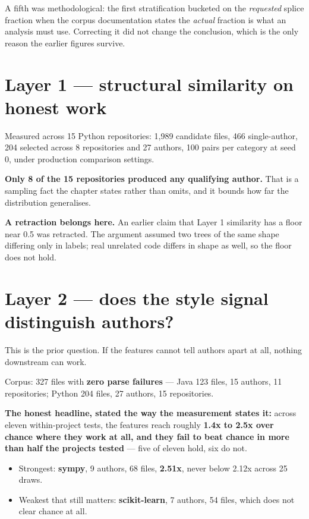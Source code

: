 A fifth was methodological: the first stratification bucketed on the
\emph{requested} splice fraction when the corpus documentation states
the \emph{actual} fraction is what an analysis must use. Correcting it
did not change the conclusion, which is the only reason the earlier
figures survive.

\hypertarget{layer-1-structural-similarity-on-honest-work}{%
\section{Layer 1 --- structural similarity on honest
work}\label{layer-1-structural-similarity-on-honest-work}}

Measured across 15 Python repositories: 1,989 candidate files, 466
single-author, 204 selected across 8 repositories and 27 authors, 100
pairs per category at seed 0, under production comparison settings.

\textbf{Only 8 of the 15 repositories produced any qualifying author.}
That is a sampling fact the chapter states rather than omits, and it
bounds how far the distribution generalises.

\textbf{A retraction belongs here.} An earlier claim that Layer 1
similarity has a floor near 0.5 was retracted. The argument assumed two
trees of the same shape differing only in labels; real unrelated code
differs in shape as well, so the floor does not hold.

\hypertarget{layer-2-does-the-style-signal-distinguish-authors}{%
\section{Layer 2 --- does the style signal distinguish
authors?}\label{layer-2-does-the-style-signal-distinguish-authors}}

This is the prior question. If the features cannot tell authors apart at
all, nothing downstream can work.

Corpus: 327 files with \textbf{zero parse failures} --- Java 123 files,
15 authors, 11 repositories; Python 204 files, 27 authors, 15
repositories.

\textbf{The honest headline, stated the way the measurement states it:}
across eleven within-project tests, the features reach roughly
\textbf{1.4x to 2.5x over chance where they work at all, and they fail
to beat chance in more than half the projects tested} --- five of eleven
hold, six do not.

\begin{itemize}
\tightlist
\item
  Strongest: \textbf{sympy}, 9 authors, 68 files, \textbf{2.51x}, never
  below 2.12x across 25 draws.
\item
  Weakest that still matters: \textbf{scikit-learn}, 7 authors, 54
  files, which does not clear chance at all.
\end{itemize}

